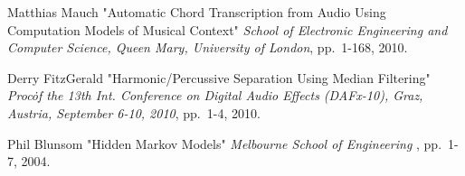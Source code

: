 \documentclass{article}
\begin{document}
\begin{thebibliography}{citations}
Matthias Mauch
"Automatic Chord Transcription from Audio Using Computation Models of Musical Context"
{\it School of Electronic Engineering and Computer Science, Queen Mary, University of London},
pp.~1-168, 2010.

Derry FitzGerald
"Harmonic/Percussive Separation Using Median Filtering"
{\it Proc\. of the 13th Int. Conference on Digital Audio Effects (DAFx-10), Graz, Austria, September 6-10, 2010},
pp.~1-4, 2010.

Phil Blunsom
"Hidden Markov Models"
{\it Melbourne School of Engineering },
pp.~1-7, 2004.

\end{thebibliography}

%
\end{document}
